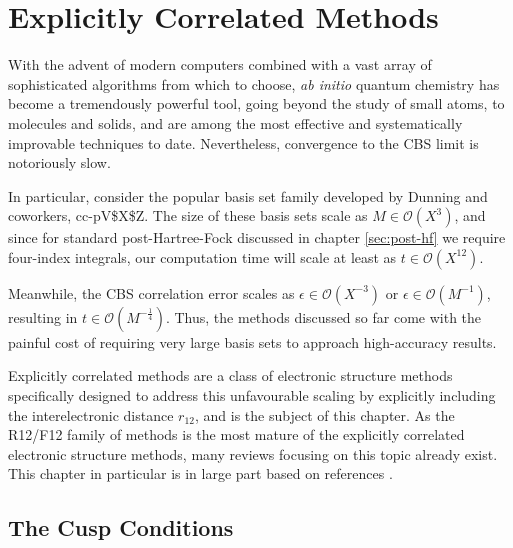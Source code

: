 \chapter{Explicitly Correlated Methods}
\label{chap:explicit}

With the advent of modern computers combined with a vast array of sophisticated algorithms from which to choose, \emph{ab initio} quantum chemistry has become a tremendously powerful tool, going beyond the study of small atoms, to molecules and solids, and are among the most effective and systematically improvable techniques to date. Nevertheless, convergence to the \gls{CBS} limit is notoriously slow.

In particular, consider the popular basis set family developed by Dunning and coworkers, \gls{cc-pV$X$Z}.\cite{dunningGaussian1989,woonGaussian1993,woonGaussian1994,petersonBenchmark1994,wilsonGaussian1996}
The size of these basis sets scale as $M\in\mathcal{O}(X^3)$, and since for standard post-Hartree-Fock discussed in chapter \ref{sec:post-hf} we require four-index integrals, our computation time will scale at least as $t\in\mathcal{O}(X^{12})$.\cite{klopperR122007}

Meanwhile, the \gls{CBS} correlation error scales as $\epsilon\in\mathcal{O}(X^{-3})$ \cite{helgakerBasisset1997,halkierBasisset1998} or $\epsilon\in\mathcal{O}(M^{-1})$,\cite{klopperInitio1995} resulting in $t\in\mathcal{O}(M^{-\frac 14})$. Thus, the methods discussed so far come with the painful cost of requiring very large basis sets to approach high-accuracy results.

Explicitly correlated methods are a class of electronic structure methods specifically designed to address this unfavourable scaling by explicitly including the interelectronic distance $r_{12}$, and is the subject of this chapter. As the R12/F12 family of methods is the most mature of the explicitly correlated electronic structure methods, many reviews focusing on this topic already exist. This chapter in particular is in large part based on references \parencite{klopperR122007,gruneisPerspective2017,hattigExplicitly2011,shiozakiMultireference2013}.




\section{The Cusp Conditions}
\label{sec:cusp}


